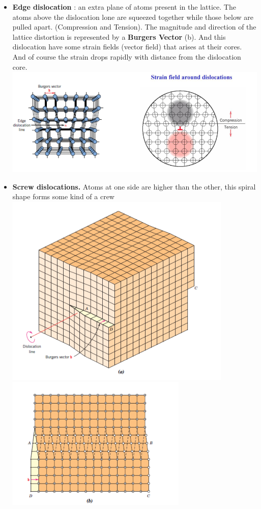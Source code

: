 \documentclass[13]{article}
\begin{document}
\begin{itemize}
\begin{itemize}
	\item \textbf{Edge dislocation} : an extra plane of atoms present in the lattice. The atoms above the dislocation lone are squeezed together while those below are pulled apart. (Compression and Tension). The magnitude and direction of the lattice distortion is represented by a \textbf{Burgers Vector} (b). And this dislocation have some strain fields (vector field) that arises at their cores. And of course the strain drops rapidly with distance from the dislocation core.\\
		\includegraphics[scale=0.5]{figures/2.png}
	\item \textbf{Screw dislocations. } Atoms at one side are higher than the other, this spiral shape forms some kind of a crew \includegraphics[scale=0.5]{figures/3.png} \includegraphics[scale=0.5]{figures/4.png}

\end{itemize}
\end{itemize}
\end{document}
